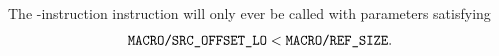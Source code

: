 The \mmuMod{}-instruction \mmuInstRightPaddedWordExtraction{} instruction will only ever be called with parameters satisfying
\[
	\texttt{MACRO}\texttt{/}{\texttt{SRC\_OFFSET\_LO}} < \texttt{MACRO}\texttt{/}{\texttt{REF\_SIZE}}.
\]
